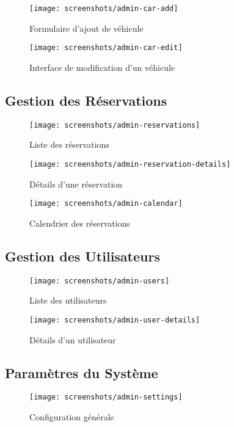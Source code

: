 \documentclass[12pt,a4paper]{report}
\begin{document}
\begin{figure}[H]
    \centering
    \texttt{[image: screenshots/admin-car-add]}
    \caption{Formulaire d'ajout de véhicule}
\end{figure}

\begin{figure}[H]
    \centering
    \texttt{[image: screenshots/admin-car-edit]}
    \caption{Interface de modification d'un véhicule}
\end{figure}

\subsection{Gestion des Réservations}
\begin{figure}[H]
    \centering
    \texttt{[image: screenshots/admin-reservations]}
    \caption{Liste des réservations}
\end{figure}

\begin{figure}[H]
    \centering
    \texttt{[image: screenshots/admin-reservation-details]}
    \caption{Détails d'une réservation}
\end{figure}

\begin{figure}[H]
    \centering
    \texttt{[image: screenshots/admin-calendar]}
    \caption{Calendrier des réservations}
\end{figure}

\subsection{Gestion des Utilisateurs}
\begin{figure}[H]
    \centering
    \texttt{[image: screenshots/admin-users]}
    \caption{Liste des utilisateurs}
\end{figure}

\begin{figure}[H]
    \centering
    \texttt{[image: screenshots/admin-user-details]}
    \caption{Détails d'un utilisateur}
\end{figure}

\subsection{Paramètres du Système}
\begin{figure}[H]
    \centering
    \texttt{[image: screenshots/admin-settings]}
    \caption{Configuration générale}
\end{figure}
\end{document}
